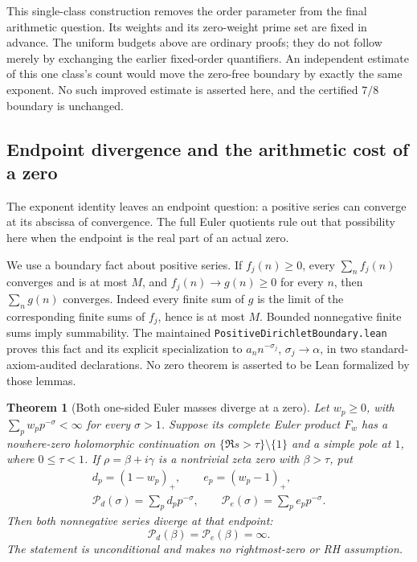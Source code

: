 \documentclass[11pt]{article}
\newtheorem{theorem}{Theorem}[section]
\theoremstyle{definition}
\begin{document}
This single-class construction removes the order parameter
from the final arithmetic question. Its weights and its
zero-weight prime set are fixed in advance.
The uniform budgets above are ordinary proofs; they do
not follow merely by exchanging the earlier fixed-order
quantifiers. An independent estimate of this one class's
count would move the zero-free boundary by exactly the
same exponent. No such improved estimate is asserted here,
and the certified $7/8$ boundary is unchanged.

\subsection{Endpoint divergence and the arithmetic cost of a zero}
\label{sec:prime-class-endpoint-cost}

The exponent identity leaves an endpoint question:
a positive series can converge at its abscissa of convergence.
The full Euler quotients rule out that possibility here
when the endpoint is the real part of an actual zero.

We use a boundary fact about positive series.
If $f_j(n)\ge0$, every $\sum_n f_j(n)$ converges and is at
most $M$, and $f_j(n)\to g(n)\ge0$ for every $n$, then
$\sum_n g(n)$ converges. Indeed every finite sum of $g$
is the limit of the corresponding finite sums of $f_j$,
hence is at most $M$. Bounded nonnegative finite sums
imply summability.
The maintained \texttt{PositiveDirichletBoundary.lean}
proves this fact and its explicit specialization to
$a_n n^{-\sigma_j}$, $\sigma_j\to\alpha$,
in two standard-axiom-audited declarations.
No zero theorem is asserted to be Lean formalized by those lemmas.

\begin{theorem}[Both one-sided Euler masses diverge at a zero]
\label{thm:two-sided-prime-endpoint-divergence}
Let $w_p\ge0$, with $\sum_p w_p p^{-\sigma}<\infty$
for every $\sigma>1$. Suppose its complete Euler product
$F_w$ has a nowhere-zero holomorphic continuation on
$\{\Re s>\tau\}\setminus\{1\}$ and a simple pole at $1$,
where $0\le\tau<1$.
If $\rho=\beta+i\gamma$ is a nontrivial zeta zero with
$\beta>\tau$, put
\[
 \begin{gathered}
 d_p=(1-w_p)_+,\qquad e_p=(w_p-1)_+,\\
 \mathcal P_d(\sigma)=\sum_p d_p p^{-\sigma},\qquad
 \mathcal P_e(\sigma)=\sum_p e_p p^{-\sigma}.
 \end{gathered}
\]
Then both nonnegative series diverge at that endpoint:
\begin{equation}
             \mathcal P_d(\beta)=\mathcal P_e(\beta)=\infty .
 \label{eq:two-sided-prime-endpoint-divergence}
\end{equation}
The statement is unconditional and makes no rightmost-zero
or RH assumption.
\end{theorem}
\end{document}
